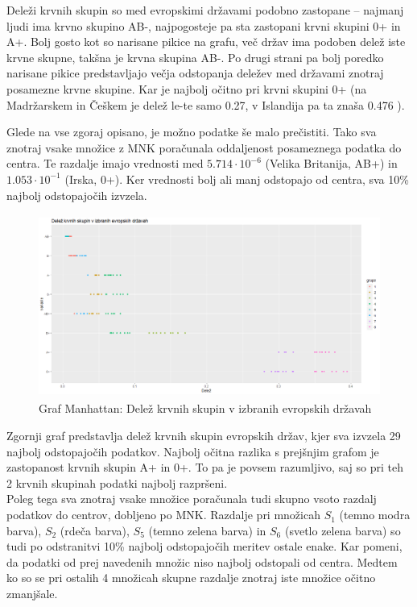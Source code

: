 \documentclass[11pt, a4paper]{article}
\begin{document}
\vspace{0.5 cm}

\noindent Deleži krvnih skupin so med evropskimi državami podobno zastopane – najmanj ljudi ima krvno skupino AB-, najpogosteje pa sta zastopani krvni skupini 0+ in A+. 
\noindent Bolj gosto kot so narisane pikice na grafu, več držav ima podoben delež iste krvne skupne, takšna je krvna skupina AB-. Po drugi strani pa bolj poredko narisane pikice predstavljajo večja odstopanja deležev med državami znotraj posamezne krvne skupine. Kar je najbolj očitno pri krvni skupini 0+ (na Madržarskem in Češkem je delež le-te samo 0.27, v Islandija pa ta znaša 0.476 ).

\vspace{0.5 cm}

\noindent Glede na vse zgoraj opisano, je možno podatke še malo prečistiti.
\noindent Tako sva znotraj vsake množice z MNK poračunala oddaljenost posameznega podatka do centra. Te razdalje imajo vrednosti med $5.714\cdot10^{-6}$ (Velika Britanija, AB+) in $1.053\cdot10^{-1}$ (Irska, 0+).
Ker vrednosti bolj ali manj odstopajo od centra, sva 10\% najbolj odstopajočih izvzela. \\

\begin{figure}[h]
\caption{Graf Manhattan: Delež krvnih skupin v izbranih evropskih državah}
\centering
\includegraphics[width=12cm, height=6cm]{grafMNKoutkri}
\end{figure}

\noindent Zgornji graf predstavlja delež krvnih skupin evropskih držav, kjer sva izvzela 29 najbolj odstopajočih podatkov. Najbolj očitna razlika s prejšnjim grafom je zastopanost krvnih skupin A+ in 0+. To pa je povsem razumljivo, saj so pri teh 2 krvnih skupinah podatki najbolj razpršeni. \\

\noindent Poleg tega sva znotraj vsake množice poračunala tudi skupno vsoto razdalj podatkov do centrov, dobljeno po MNK. Razdalje pri množicah $S_1$ (temno modra barva), $S_2$ (rdeča barva), $S_5$ (temno zelena barva) in $S_6$ (svetlo zelena barva) so tudi po odstranitvi 10\% najbolj odstopajočih meritev ostale enake. Kar pomeni, da podatki od prej navedenih množic niso najbolj odstopali od centra. Medtem ko so se pri ostalih 4 množicah skupne razdalje znotraj iste množice očitno zmanjšale.
\end{document}
